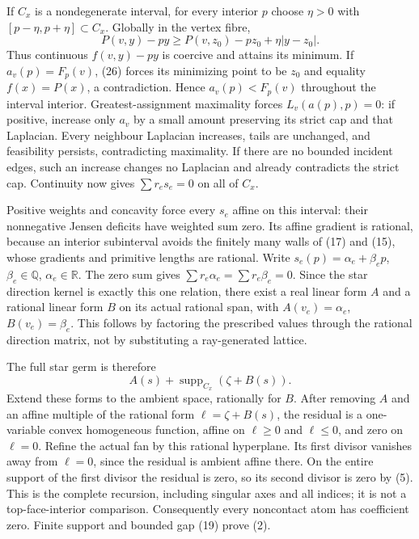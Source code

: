 \documentclass[
  11pt,
]{article}
\begin{document}
If \(C_x\) is a nondegenerate interval, for every interior \(p\) choose
\(\eta>0\) with \([p-\eta,p+\eta]\subset C_x\). Globally in the vertex
fibre, \[
 P(v,y)-py\geq P(v,z_0)-pz_0+\eta|y-z_0|.                 \tag{26}
\] Thus continuous \(f(v,y)-py\) is coercive and attains its minimum. If
\(a_v(p)=F_p(v)\), (26) forces its minimizing point to be \(z_0\) and
equality \(f(x)=P(x)\), a contradiction. Hence \(a_v(p)<F_p(v)\)
throughout the interval interior. Greatest-assignment maximality forces
\(L_v(a(p),p)=0\): if positive, increase only \(a_v\) by a small amount
preserving its strict cap and that Laplacian. Every neighbour Laplacian
increases, tails are unchanged, and feasibility persists, contradicting
maximality. If there are no bounded incident edges, such an increase
changes no Laplacian and already contradicts the strict cap. Continuity
now gives \(\sum r_es_e=0\) on all of \(C_x\).

Positive weights and concavity force every \(s_e\) affine on this
interval: their nonnegative Jensen deficits have weighted sum zero. Its
affine gradient is rational, because an interior subinterval avoids the
finitely many walls of (17) and (15), whose gradients and primitive
lengths are rational. Write \(s_e(p)=\alpha_e+\beta_ep\),
\(\beta_e\in\mathbb Q\), \(\alpha_e\in\mathbb R\). The zero sum gives
\(\sum r_e\alpha_e=\sum r_e\beta_e=0\). Since the star direction kernel
is exactly this one relation, there exist a real linear form \(A\) and a
rational linear form \(B\) on its actual rational span, with
\(A(v_e)=\alpha_e\), \(B(v_e)=\beta_e\). This follows by factoring the
prescribed values through the rational direction matrix, not by
substituting a ray-generated lattice.

The full star germ is therefore \[
                              A(s)+\operatorname{supp}_{C_x}(\zeta+B(s)).\tag{27}
\] Extend these forms to the ambient space, rationally for \(B\). After
removing \(A\) and an affine multiple of the rational form
\(\ell=\zeta+B(s)\), the residual is a one-variable convex homogeneous
function, affine on \(\ell\geq0\) and \(\ell\leq0\), and zero on
\(\ell=0\). Refine the actual fan by this rational hyperplane. Its first
divisor vanishes away from \(\ell=0\), since the residual is ambient
affine there. On the entire support of the first divisor the residual is
zero, so its second divisor is zero by (5). This is the complete
recursion, including singular axes and all indices; it is not a
top-face-interior comparison. Consequently every noncontact atom has
coefficient zero. Finite support and bounded gap (19) prove (2).
\end{document}
